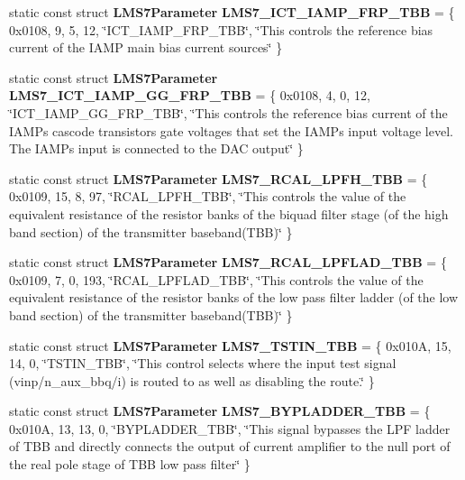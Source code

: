 \begin{DoxyCompactItemize}
\item 
static const struct {\bf L\+M\+S7\+Parameter} {\bf L\+M\+S7\+\_\+\+I\+C\+T\+\_\+\+I\+A\+M\+P\+\_\+\+F\+R\+P\+\_\+\+T\+BB} = \{ 0x0108, 9, 5, 12, \char`\"{}\+I\+C\+T\+\_\+\+I\+A\+M\+P\+\_\+\+F\+R\+P\+\_\+\+T\+B\+B\char`\"{}, \char`\"{}\+This controls the reference bias current of the I\+A\+M\+P main bias current sources\char`\"{} \}
\item 
static const struct {\bf L\+M\+S7\+Parameter} {\bf L\+M\+S7\+\_\+\+I\+C\+T\+\_\+\+I\+A\+M\+P\+\_\+\+G\+G\+\_\+\+F\+R\+P\+\_\+\+T\+BB} = \{ 0x0108, 4, 0, 12, \char`\"{}\+I\+C\+T\+\_\+\+I\+A\+M\+P\+\_\+\+G\+G\+\_\+\+F\+R\+P\+\_\+\+T\+B\+B\char`\"{}, \char`\"{}\+This controls the reference bias current of the I\+A\+M\+P\textquotesingle{}s cascode transistors gate voltages that set the I\+A\+M\+P\textquotesingle{}s input voltage level. The I\+A\+M\+P\textquotesingle{}s input is connected to the D\+A\+C output\char`\"{} \}
\item 
static const struct {\bf L\+M\+S7\+Parameter} {\bf L\+M\+S7\+\_\+\+R\+C\+A\+L\+\_\+\+L\+P\+F\+H\+\_\+\+T\+BB} = \{ 0x0109, 15, 8, 97, \char`\"{}\+R\+C\+A\+L\+\_\+\+L\+P\+F\+H\+\_\+\+T\+B\+B\char`\"{}, \char`\"{}\+This controls the value of the equivalent resistance of the resistor banks of the biquad filter stage (of the high band section) of the transmitter baseband(\+T\+B\+B)\char`\"{} \}
\item 
static const struct {\bf L\+M\+S7\+Parameter} {\bf L\+M\+S7\+\_\+\+R\+C\+A\+L\+\_\+\+L\+P\+F\+L\+A\+D\+\_\+\+T\+BB} = \{ 0x0109, 7, 0, 193, \char`\"{}\+R\+C\+A\+L\+\_\+\+L\+P\+F\+L\+A\+D\+\_\+\+T\+B\+B\char`\"{}, \char`\"{}\+This controls the value of the equivalent resistance of the resistor banks of the low pass filter ladder (of the low band section) of the transmitter baseband(\+T\+B\+B)\char`\"{} \}
\item 
static const struct {\bf L\+M\+S7\+Parameter} {\bf L\+M\+S7\+\_\+\+T\+S\+T\+I\+N\+\_\+\+T\+BB} = \{ 0x010\+A, 15, 14, 0, \char`\"{}\+T\+S\+T\+I\+N\+\_\+\+T\+B\+B\char`\"{}, \char`\"{}\+This control selects where the input test signal (vinp/n\+\_\+aux\+\_\+bbq/i) is routed to as well as disabling the route.\char`\"{} \}
\item 
static const struct {\bf L\+M\+S7\+Parameter} {\bf L\+M\+S7\+\_\+\+B\+Y\+P\+L\+A\+D\+D\+E\+R\+\_\+\+T\+BB} = \{ 0x010\+A, 13, 13, 0, \char`\"{}\+B\+Y\+P\+L\+A\+D\+D\+E\+R\+\_\+\+T\+B\+B\char`\"{}, \char`\"{}\+This signal bypasses the L\+P\+F ladder of T\+B\+B and directly connects the output of current amplifier to the null port of the real pole stage of T\+B\+B low pass filter\char`\"{} \}

\end{DoxyCompactItemize}
